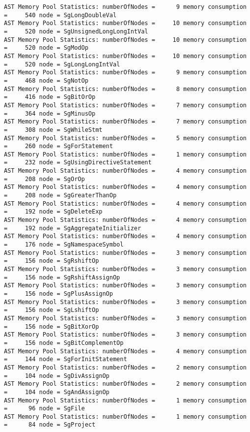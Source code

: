 {{\begin{verbatim}
AST Memory Pool Statistics: numberOfNodes =      9 memory consumption =     540 node = SgLongDoubleVal
AST Memory Pool Statistics: numberOfNodes =     10 memory consumption =     520 node = SgUnsignedLongLongIntVal
AST Memory Pool Statistics: numberOfNodes =     10 memory consumption =     520 node = SgModOp
AST Memory Pool Statistics: numberOfNodes =     10 memory consumption =     520 node = SgLongLongIntVal
AST Memory Pool Statistics: numberOfNodes =      9 memory consumption =     468 node = SgNotOp
AST Memory Pool Statistics: numberOfNodes =      8 memory consumption =     416 node = SgBitOrOp
AST Memory Pool Statistics: numberOfNodes =      7 memory consumption =     364 node = SgMinusOp
AST Memory Pool Statistics: numberOfNodes =      7 memory consumption =     308 node = SgWhileStmt
AST Memory Pool Statistics: numberOfNodes =      5 memory consumption =     260 node = SgForStatement
AST Memory Pool Statistics: numberOfNodes =      1 memory consumption =     232 node = SgUsingDirectiveStatement
AST Memory Pool Statistics: numberOfNodes =      4 memory consumption =     208 node = SgOrOp
AST Memory Pool Statistics: numberOfNodes =      4 memory consumption =     208 node = SgGreaterThanOp
AST Memory Pool Statistics: numberOfNodes =      4 memory consumption =     192 node = SgDeleteExp
AST Memory Pool Statistics: numberOfNodes =      4 memory consumption =     192 node = SgAggregateInitializer
AST Memory Pool Statistics: numberOfNodes =      4 memory consumption =     176 node = SgNamespaceSymbol
AST Memory Pool Statistics: numberOfNodes =      3 memory consumption =     156 node = SgRshiftOp
AST Memory Pool Statistics: numberOfNodes =      3 memory consumption =     156 node = SgRshiftAssignOp
AST Memory Pool Statistics: numberOfNodes =      3 memory consumption =     156 node = SgPlusAssignOp
AST Memory Pool Statistics: numberOfNodes =      3 memory consumption =     156 node = SgLshiftOp
AST Memory Pool Statistics: numberOfNodes =      3 memory consumption =     156 node = SgBitXorOp
AST Memory Pool Statistics: numberOfNodes =      3 memory consumption =     156 node = SgBitComplementOp
AST Memory Pool Statistics: numberOfNodes =      4 memory consumption =     144 node = SgForInitStatement
AST Memory Pool Statistics: numberOfNodes =      2 memory consumption =     104 node = SgDivAssignOp
AST Memory Pool Statistics: numberOfNodes =      2 memory consumption =     104 node = SgAndAssignOp
AST Memory Pool Statistics: numberOfNodes =      1 memory consumption =      96 node = SgFile
AST Memory Pool Statistics: numberOfNodes =      1 memory consumption =      84 node = SgProject

\end{verbatim}}}
